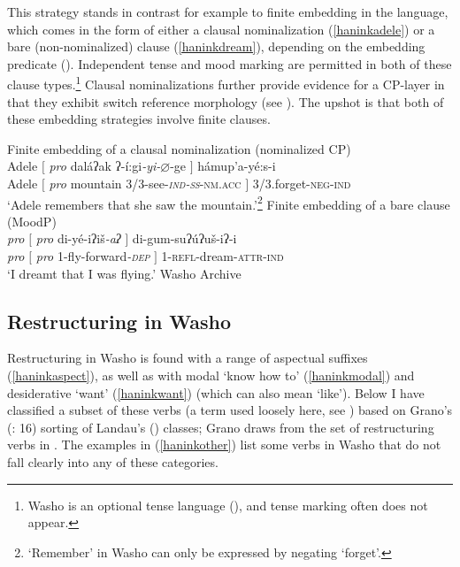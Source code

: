 \documentclass[output=paper]{langscibook}
\begin{document}
This strategy stands in contrast for example to finite embedding in the language, which comes in the form of either a clausal nominalization  (\ref{haninkadele}) or a bare (non-nominalized) clause (\ref{haninkdream}), depending on the embedding predicate (\citealt{haninkbochnak2018}). Independent tense and mood marking are permitted in both of these clause types.\footnote{Washo is an optional tense language (\citealt{bochnak2016}), and tense marking often does not appear.}  Clausal nominalizations further provide evidence for a CP-layer in that they exhibit switch reference morphology (see \citealt{arregihanink2018}). The upshot is that both of these embedding strategies involve finite clauses.

\ea Finite embedding of a clausal nominalization (nominalized CP)\label{haninkadele}\\
\gll Adele $[$ \textit{pro} daláʔak ʔ-í:gi\textit{-yi-$\varnothing$}-ge $]$ hámup'a-yé:s-i\\
Adele $[$ \textit{pro} mountain 3/3-see-\textit{\textsc{ind-ss}}\textsc{-nm.acc} $]$ 3/3.forget-\textsc{neg-ind}\\
\glt`Adele remembers that she saw the mountain.'\footnote{`Remember' in Washo can only be expressed by negating `forget'.}
\ex Finite embedding of a bare clause (MoodP)\label{haninkdream}\\
\gll \textit{pro} $[$ \textit{pro} di-yé-{iʔ}iš{\itshape-aʔ} $]$ di-gum-su{ʔ}ú{ʔ}uš-i{ʔ}-i \\
 \textit{pro} $[$ \textit{pro} 1-fly-forward\textit{-\textsc{dep}} $]$ 1-\textsc{refl}-dream-\textsc{attr-ind}\\
\glt `I dreamt that I was flying.' \hfill Washo Archive
\z

\subsection{Restructuring in Washo}
Restructuring in Washo is found with a range of aspectual suffixes (\ref{haninkaspect}), as well as with modal `know how to' (\ref{haninkmodal}) and  desiderative `want' (\ref{haninkwant}) (which can also mean `like'). Below I have classified a subset of these verbs (a term used loosely here, see ) based on Grano's (\citeyear{grano2012diss}: 16) sorting of Landau's (\citeyear{landau2000}) classes; Grano draws from the set of restructuring verbs in \citet[342]{wurmbrand2001}. The examples in (\ref{haninkother}) list some verbs in Washo that do not fall clearly into any of these categories.
\end{document}
